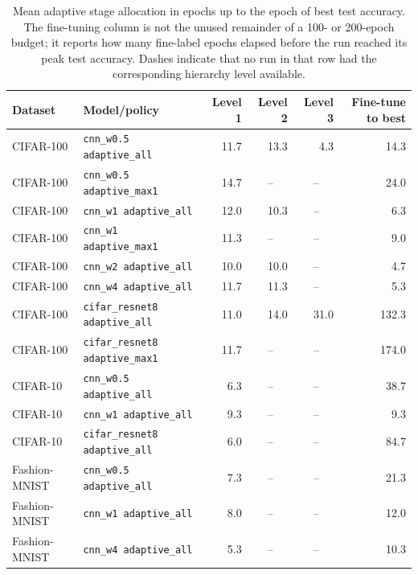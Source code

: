 \begin{table}[h]
\centering
\small
\begin{tabular}{llrrrr}
\hline
Dataset & Model/policy & Level 1 & Level 2 & Level 3 & Fine-tune to best \\
\hline
CIFAR-100 & \texttt{cnn\_w0.5 adaptive\_all} & 11.7 & 13.3 & 4.3 & 14.3 \\
CIFAR-100 & \texttt{cnn\_w0.5 adaptive\_max1} & 14.7 & \multicolumn{1}{c}{--} & \multicolumn{1}{c}{--} & 24.0 \\
CIFAR-100 & \texttt{cnn\_w1 adaptive\_all} & 12.0 & 10.3 & \multicolumn{1}{c}{--} & 6.3 \\
CIFAR-100 & \texttt{cnn\_w1 adaptive\_max1} & 11.3 & \multicolumn{1}{c}{--} & \multicolumn{1}{c}{--} & 9.0 \\
CIFAR-100 & \texttt{cnn\_w2 adaptive\_all} & 10.0 & 10.0 & \multicolumn{1}{c}{--} & 4.7 \\
CIFAR-100 & \texttt{cnn\_w4 adaptive\_all} & 11.7 & 11.3 & \multicolumn{1}{c}{--} & 5.3 \\
CIFAR-100 & \texttt{cifar\_resnet8 adaptive\_all} & 11.0 & 14.0 & 31.0 & 132.3 \\
CIFAR-100 & \texttt{cifar\_resnet8 adaptive\_max1} & 11.7 & \multicolumn{1}{c}{--} & \multicolumn{1}{c}{--} & 174.0 \\
CIFAR-10 & \texttt{cnn\_w0.5 adaptive\_all} & 6.3 & \multicolumn{1}{c}{--} & \multicolumn{1}{c}{--} & 38.7 \\
CIFAR-10 & \texttt{cnn\_w1 adaptive\_all} & 9.3 & \multicolumn{1}{c}{--} & \multicolumn{1}{c}{--} & 9.3 \\
CIFAR-10 & \texttt{cifar\_resnet8 adaptive\_all} & 6.0 & \multicolumn{1}{c}{--} & \multicolumn{1}{c}{--} & 84.7 \\
Fashion-MNIST & \texttt{cnn\_w0.5 adaptive\_all} & 7.3 & \multicolumn{1}{c}{--} & \multicolumn{1}{c}{--} & 21.3 \\
Fashion-MNIST & \texttt{cnn\_w1 adaptive\_all} & 8.0 & \multicolumn{1}{c}{--} & \multicolumn{1}{c}{--} & 12.0 \\
Fashion-MNIST & \texttt{cnn\_w4 adaptive\_all} & 5.3 & \multicolumn{1}{c}{--} & \multicolumn{1}{c}{--} & 10.3 \\
\hline
\end{tabular}
\caption{Mean adaptive stage allocation in epochs up to the epoch of best test
accuracy. The fine-tuning column is not the unused remainder of a 100- or
200-epoch budget; it reports how many fine-label epochs elapsed before the run
reached its peak test accuracy. Dashes indicate that no run in that row had the
corresponding hierarchy level available.}
\label{tab:appg-adaptive-stage-allocation}
\end{table}

